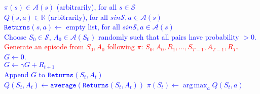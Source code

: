 \documentclass{standalone}
\DeclareMathOperator*{\argmax}{arg\,max}
\begin{document}
\pagestyle{empty}
\begin{algorithm}[H]
  \textcolor{blue}{$\pi(s) \in \mathcal A(s)$ (arbitrarily), for all $s \in \mathcal S$ \\
  $Q(s,a) \in \mathbb R$ (arbitrarily), for all $s in \mathcal S, a \in \mathcal   A(s)$ \\
  $\texttt{Returns}(s,a) \gets$ empty list, for all $s in \mathcal S, a \in   \mathcal   A(s)$} \\
 {
  \textcolor{blue}{Choose $S_0 \in \mathcal S$, $A_0 \in \mathcal A(S_0)$ randomly such that all   pairs have probability $>0$.} \\
  \textcolor{red}{Generate an episode from $S_0, A_0$ following $\pi$: $S_0, A_0, R_1, \ldots,   S_{T-1}, A_{T-1}, R_T$.}\\
  \textcolor{blue}{$G \gets 0$.\\
   {
    $G \gets \gamma G + R_{t+1}$ \\
     {
Append $G$ to $\texttt{Returns}(S_t, A_t)$ \\
$Q(S_t, A_t) \gets \texttt{average}(\texttt{Returns}(S_t, A_t))$ 
$\pi(S_t) \gets \argmax_a Q(S_t, a)$ \hspace{61pt} }
    }
  }
}
\end{algorithm}
\end{document}
